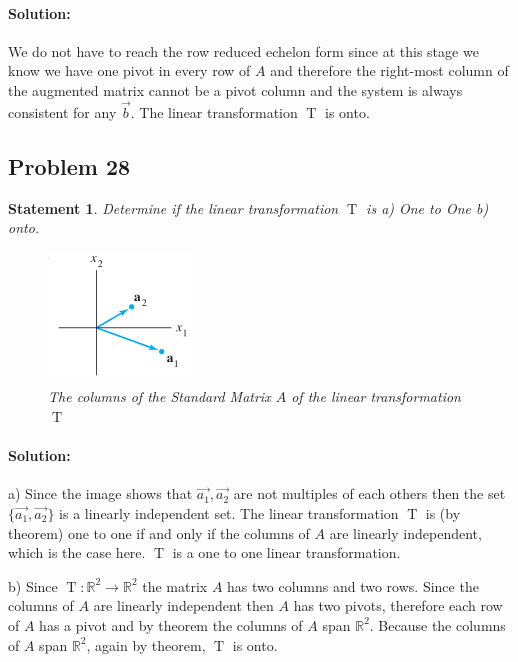 \documentclass[12pt, letterpaper]{article}
\newcommand{\R}{\mathbb{R}}
\theoremstyle{statement}
\theoremstyle{statement}
\newtheorem*{atmStat}{Statement}
\newenvironment{Solution}{\noindent\ignorespaces\paragraph{Solution:}}{\hfill \ding{122}\par\noindent}
\begin{document}
\begin{Solution}
    We do not have to reach the row reduced echelon form since at this stage we know we have one pivot in every row of $A$ and therefore the right-most column of the augmented matrix cannot be a pivot column and the system is always consistent for any $\Vec{b}$. The linear transformation $\operatorname{T}$ is onto. 
    
    \end{Solution}
    \subsection*{Problem 28}
    \begin{atmStat}
    Determine if the linear transformation $\operatorname{T}$ is a) One to One b) onto.
    
    \begin{figure}[H]
        \centering
        \includegraphics[scale=1.0]{Capture}
        \caption{The columns of the Standard Matrix $A$ of the linear transformation $\operatorname{T}$}
        \label{fig:fig1}
    \end{figure}
    \end{atmStat}
    \begin{Solution}
    
    a) Since the image shows that $\Vec{a_1}, \Vec{a_2}$ are not multiples of each others then the set $\{\Vec{a_1}, \Vec{a_2}\}$ is a linearly independent set. The linear transformation $\operatorname{T}$ is (by theorem) one to one if and only if the columns of $A$ are linearly independent, which is the case here. $\operatorname{T}$ is a one to one linear transformation.
    
    b) Since $\operatorname{T}:\R^2\longrightarrow\R^2$ the matrix $A$ has two columns and two rows. Since the columns of $A$ are linearly independent then $A$ has two pivots, therefore each row of $A$ has a pivot and by theorem the columns of $A$ span $\R^2$. Because the columns of $A$ span $\R^2$, again by theorem, $\operatorname{T}$ is onto.
    
    \end{Solution}
\end{document}
